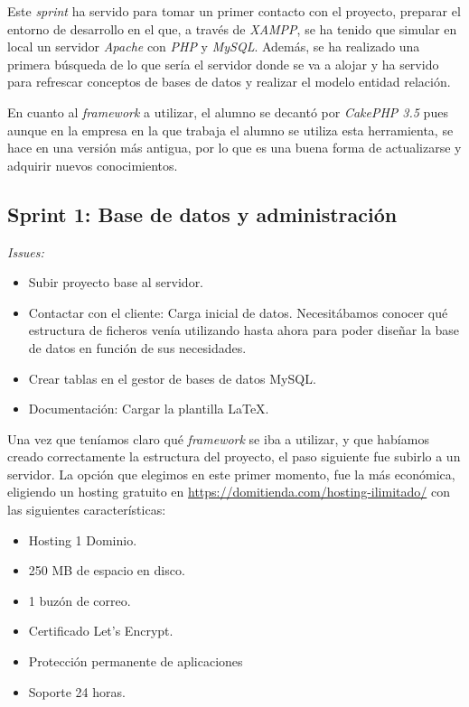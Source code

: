 Este \textit{sprint} ha servido para tomar un primer contacto con el proyecto, preparar el entorno de desarrollo en el que, a través de \textit{XAMPP}, se ha tenido que simular en local un servidor \textit{Apache} con \textit{PHP} y \textit{MySQL}. Además, se ha realizado una primera búsqueda de lo que sería el servidor donde se va a alojar y ha servido para refrescar conceptos de bases de datos y realizar el modelo entidad relación.

En cuanto al \textit{framework} a utilizar, el alumno se decantó por \textit{CakePHP 3.5} pues aunque en la empresa en la que trabaja el alumno se utiliza esta herramienta, se hace en una versión más antigua, por lo que es una buena forma de actualizarse y adquirir nuevos conocimientos. 

\subsection{Sprint 1: Base de datos y administración}

\textit{Issues:}
\begin{itemize}
	\item Subir proyecto base al servidor.
	\item Contactar con el cliente: Carga inicial de datos. Necesitábamos conocer qué estructura de ficheros venía utilizando hasta ahora para poder diseñar la base de datos en función de sus necesidades. 
	\item Crear tablas en el gestor de bases de datos MySQL.
	\item Documentación: Cargar la plantilla \LaTeX.
\end{itemize}

Una vez que teníamos claro qué \textit{framework} se iba a utilizar, y que habíamos creado correctamente la estructura del proyecto, el paso siguiente fue subirlo a un servidor. La opción que elegimos en este primer momento, fue la más económica, eligiendo un hosting gratuito en \url{https://domitienda.com/hosting-ilimitado/} con las siguientes características:

\begin{itemize}
	\item Hosting 1 Dominio.
	\item 250 MB de espacio en disco. 
	\item 1 buzón de correo.
	\item Certificado Let's Encrypt.
	\item Protección permanente de aplicaciones
	\item Soporte 24 horas.
\end{itemize}

